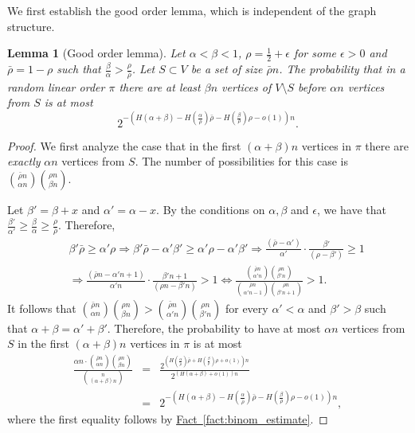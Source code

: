 \documentclass[11pt]{article}
\numberwithin{equation}{section}
\newtheorem{lemma}[theorem]{Lemma}
\theoremstyle{definition}
\theoremstyle{plain}
\newcommand{\expref}[2]{\hyperref[#2]{#1~\ref{#2}}}
\theoremstyle{plain}
\begin{document}
We first establish the good order lemma, which is independent of the graph structure.

\begin{lemma} [Good order lemma]
	Let $\alpha < \beta < 1$, $\rho= \frac{1}{2}+\epsilon$ for some $\epsilon>0$ %
	and $\bar{\rho}=1-\rho$ such that $\frac{\beta}{\alpha} > \frac{\rho}{\bar{\rho}}$. Let $S\subset V$ be a set of size $\bar{\rho}n$. The probability that in a random linear order $\pi$ there are at least $\beta n$ vertices of $V\setminus S$  before $\alpha n$ vertices from $S$ is at most $$2^{-(H(\alpha+\beta)-H(\frac{\alpha}{\bar{\rho}})\bar{\rho}-H(\frac{\beta}{{\rho}}){\rho}-o(1))n}.$$\label{lem:order}
\end{lemma}
\begin{proof}
	We first analyze the case that in the first $(\alpha+\beta)n$ vertices in $\pi$ there are \emph{exactly} $\alpha n$ vertices from $S$. The number of possibilities for this case is $\binom{\bar{\rho} n}{\alpha n}\binom{\rho n}{\beta n}$.
	
	Let $\beta' = \beta+x$ and $\alpha'=\alpha-x$. By the conditions on $\alpha,\beta$ and $\epsilon$, we have that $\frac{\beta'}{\alpha'}\geq\frac{\beta}{\alpha}\geq \frac{\rho}{\bar{\rho}}$. Therefore,
	\begin{eqnarray}
		& &  \beta'\bar{\rho}\geq \alpha'\rho\Rightarrow \beta'\bar{\rho}-\alpha'\beta'\geq \alpha'\rho-\alpha'\beta'\Rightarrow \frac{(\bar{\rho}-\alpha')}{\alpha'}\cdot \frac{\beta'}{(\rho-\beta')}\geq 1 \\
		& & \Rightarrow \frac{(\bar{\rho}n-\alpha'n+1)}{\alpha'n}\cdot \frac{\beta'n+1}{(\rho n-\beta'n)} > 1 \iff\frac{\binom{\bar{\rho} n}{\alpha' n}\binom{\rho n}{\beta' n}}{\binom{\bar{\rho} n}{\alpha' n-1}\binom{\rho n}{\beta' n+1}}>1.
	\end{eqnarray}
	It follows that
	$\binom{\bar{\rho}n}{\alpha n}\binom{\rho n}{\beta n}> \binom{\bar{\rho} n}{\alpha'n}\binom{\rho n}{\beta' n}$ for every $\alpha'< \alpha$  and $\beta'>\beta$ such that $\alpha+\beta=\alpha'+\beta'$. Therefore, the probability to have at most $\alpha n$ vertices from $S$ in the first $(\alpha+\beta)n$ vertices in $\pi$ is at most
	\begin{eqnarray}
		\frac{\alpha n\cdot \binom{\bar{\rho}n}{\alpha n}\binom{\rho n}{\beta n}}{\binom{n}{(\alpha+\beta)n}}&=&\frac{2^{(H(\frac{\alpha}{\bar{\rho}})\bar{\rho}+H(\frac{\beta}{{\rho}}){\rho}+o(1))n}}{2^{(H(\alpha+\beta)+o(1))n}}\\
		& = & 2^{-(H(\alpha+\beta)-H(\frac{\alpha}{\bar{\rho}})\bar{\rho}-H(\frac{\beta}{{\rho}}){\rho}-o(1))n},
	\end{eqnarray}
where the first equality follows
by  %
\expref{Fact}{fact:binom_estimate}.
\end{proof}
\end{document}
